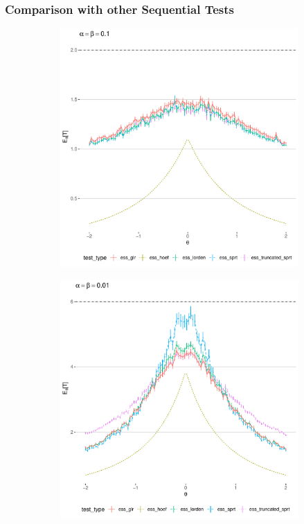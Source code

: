 \documentclass[10pt]{beamer}
\begin{document}
\begin{frame}
\frametitle{Comparison with other Sequential Tests}

\begin{figure}
\centering
\begin{subfigure}{0.49\textwidth}
    \includegraphics[width=\textwidth]{images/ess_alpha1e1}
\end{subfigure}
\hfill
\begin{subfigure}{0.49\textwidth}
    \includegraphics[width=\textwidth]{images/ess_alpha1e2}
\end{subfigure}
\end{figure}

\end{frame}
\end{document}

